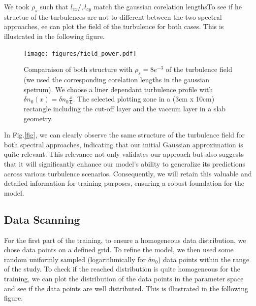 \documentclass[11pt,a4paper,openany]{report}
\begin{document}
\begin{multicols}{2}
    We took $\rho_s$ such that $l_{cx} /, l_{cy}$ match the gaussian corelation lengthsTo see if he structue of the turbulences are not to different between the two spectral approaches,  ee can plot the field of the turbulence for both cases. This is illustrated in the following figure.

    \begin{figure}[H]
        \centering
        \texttt{[image: figures/field\_power.pdf]}
        \caption{Comparaison of both structure with $\rho_s = 8e^{-3}$ of the turbulence field (we used the corresponding corelation lengths in the gaussian spetrum). We choose a liner dependant turbulence profile with $\delta n_0(x) = \delta n_0 \frac{x}{L}$. The selected plotting zone in a (3cm x 10cm) rectangle including the cut-off layer and the vaccum layer in a slab geometry.}

        \label{fig:density_field}
    \end{figure}

    In Fig.\ref{fig}, we can clearly observe the same structure of the turbulence field for both spectral approaches, indicating that our initial Gaussian approximation is quite relevant. This relevance not only validates our approach but also suggests that it will significantly enhance our model's ability to generalize its predictions across various turbulence scenarios. Consequently, we will retain this valuable and detailed information for training purposes, ensuring a robust foundation for the model.

    \subsection{Data Scanning}

    For the first part of the training, to ensure a homogeneous data distribution, we chose data points on a defined grid. To refine the model, we then used some random uniformly sampled (logarithmically for $\delta n_0$) data points within the range of the study. To check if the reached distribution is quite homogeneous for the training, we can plot the distribution of the data points in the parameter space and see if the data points are well distributed. This is illustrated in the following figure.


\end{multicols}
\end{document}
